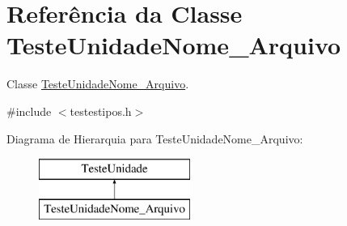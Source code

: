 \hypertarget{class_teste_unidade_nome___arquivo}{
\section{\-Referência da \-Classe \-Teste\-Unidade\-Nome\-\_\-\-Arquivo}
\label{class_teste_unidade_nome___arquivo}
}


\-Classe \hyperlink{class_teste_unidade_nome___arquivo}{\-Teste\-Unidade\-Nome\-\_\-\-Arquivo}.  




{\ttfamily \#include $<$testestipos.\-h$>$}

\-Diagrama de \-Hierarquia para \-Teste\-Unidade\-Nome\-\_\-\-Arquivo\-:\begin{figure}[H]
\begin{center}
\leavevmode
\includegraphics[height=2.000000cm]{class_teste_unidade_nome___arquivo}
\end{center}
\end{figure}
